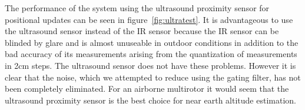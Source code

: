 The performance of the system using the ultrasound proximity sensor for positional updates can be seen in figure~\ref{fig:ultratest}.
It is advantageous to use the ultrasound sensor instead of the IR sensor because the IR sensor can be blinded by glare and is almost
unuseable in outdoor conditions in addition to the bad accuracy of its measurements arising from the quantization of measurements in
2cm steps. The ultrasound sensor does not have these problems. However it is clear that the noise, which we attempted to reduce using the
gating filter, has not been completely eliminated. For an airborne multirotor it would seem that the ultrasound proximity 
sensor is the best choice for near earth altitude estimation.

	
